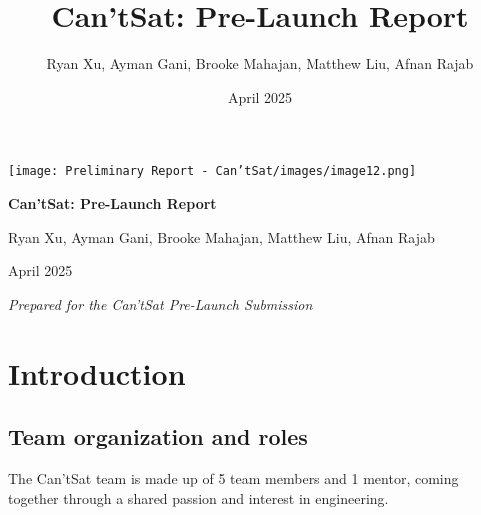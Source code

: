 \documentclass[10pt,twocolumn]{article}
\title{\Huge \textbf{Can'tSat: Pre-Launch Report}}
\author{\large Ryan Xu, Ayman Gani, Brooke Mahajan, Matthew Liu, Afnan Rajab}
\date{\large April 2025}
\begin{document}
\begin{titlepage}
    \centering
    \vspace*{2cm}

    \texttt{[image: Preliminary Report - Can'tSat/images/image12.png]}\par\vspace{1cm}

    {\Huge \bfseries Can'tSat: Pre-Launch Report\par}
    \vspace{1.5cm}

    {\Large Ryan Xu, Ayman Gani, Brooke Mahajan, Matthew Liu, Afnan Rajab \par}
    \vspace{1cm}

    {\large April 2025 \par}
    
    \vfill
    \textit{Prepared for the Can'tSat Pre-Launch Submission} \par
\end{titlepage}

\newpage
\tableofcontents
\newpage
    

\section{Introduction}

\subsection{\textbf{Team organization and roles}}
The Can'tSat team is made up of 5 team members and 1 mentor, coming together through a shared passion and interest in engineering.
\end{document}
